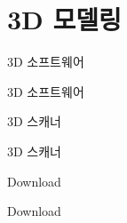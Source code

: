 
\section{3D 모델링}

\begin{frame}{3D 소프트웨어}
\begin{block}{3D 소프트웨어}

\end{block}
\end{frame}

\begin{frame}{3D 스캐너}
\begin{block}{3D 스캐너}

\end{block}
\end{frame}

\begin{frame}{Download}
\begin{block}{Download}

\end{block}
\end{frame}
